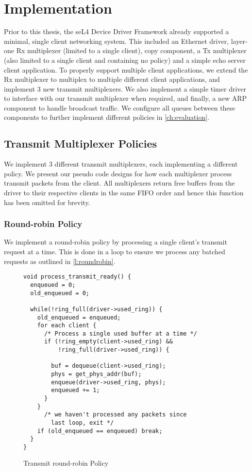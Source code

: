 \chapter{Implementation}\label{ch:implementation}

Prior to this thesis, the seL4 Device Driver Framework already supported a minimal, single client
networking system. This included an Ethernet driver, layer-one Rx multiplexer (limited to a single 
client), copy component, a Tx multiplexer (also limited to a single client and containing no policy) and 
a simple echo server client application. To properly support multiple client applications, we
extend the Rx multiplexer to multiplex to multiple different client applications, and implement 3
new transmit multiplexers. We also implement a simple timer driver to interface with our 
transmit multiplexer when required, and finally, a new ARP component to handle broadcast traffic. 
We configure all queues between these components to further implement different
policies in \autoref{ch:evaluation}.


\section{Transmit Multiplexer Policies}

We implement 3 different transmit multiplexers, each implementing a different policy. 
We present our pseudo code designs for how each multiplexer process transmit packets from
the client. All multiplexers return free buffers from the driver to their respective 
clients in the same FIFO order and hence this function has been omitted for brevity. 

\subsection{Round-robin Policy}
We implement a round-robin policy by processing a single client's transmit request at a time.
This is done in a loop to ensure we process any batched requests as outlined in \autoref{l:roundrobin}.

\begin{figure} [H]
    \begin{verbatim}
void process_transmit_ready() {
  enqueued = 0;
  old_enqueued = 0;

  while(!ring_full(driver->used_ring)) {
    old_enqueued = enqueued;
    for each client {
      /* Process a single used buffer at a time */
      if (!ring_empty(client->used_ring) &&
          !ring_full(driver->used_ring)) {
        
        buf = dequeue(client->used_ring);
        phys = get_phys_addr(buf);
        enqueue(driver->used_ring, phys);
        enqueued += 1;
      }
    }
      /* we haven't processed any packets since 
        last loop, exit */
    if (old_enqueued == enqueued) break;
  }
}
\end{verbatim}
\caption{Transmit round-robin Policy}
\label{l:roundrobin}
\end{figure}

